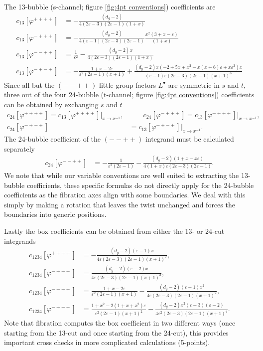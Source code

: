 \documentclass[11pt]{article}
\newcommand{\nn}{\nonumber}
\newcommand{\vphi}{\varphi}
\newcommand{\vep}{\varepsilon}
\begin{document}
The 13-bubble (s-channel; figure \ref{fig:4pt conventions}) coefficients are
\begin{align} \label{4pt first coeff}
	c_{13}[\vphi^{++++}]
	&= -\frac{(d_g-2)}{4(2\vep-3) (2\vep-1) (1+x)}
	\\
	c_{13}[\vphi^{-+++}]
	&= - \frac{ (d_g-2) }{4(\vep-1) (2\vep-3) (2\vep-1) } \frac{x^2 (3+x-\vep) }{(1+x)}
	\\
	c_{13}[\vphi^{--++}]
	&= \frac{1}{\vep^2} - \frac{(d_g-2) x}{4(2\vep-3) (2\vep-1) (1+x)}
	\label{eq: 13 --++}
	\\
	c_{13}[\vphi^{-+-+}]
	&= -\frac{1 + x - 2\vep}{\vep^2 (2 \vep -1) (x+1)}
	+ \frac{(d_g-2) x (-2 +5 x + x^2 - x(x+6)\vep + x\vep^2) x}{(\vep -1) \vep  (2 \vep -3) (2 \vep -1) (x+1)^3}
\end{align}
Since all but the $(--++)$ little group factors $L^\bullet$ are symmetric in $s$ and $t$, three out of the four 24-bubble (t-channel; figure \ref{fig:4pt conventions}) coefficients can be obtained by exchanging $s$ and $t$
\begin{align}
	c_{24}[\vphi^{++++}]
	= c_{13}[\vphi^{++++}]\vert_{x\to x^{-1}},
	&\qquad
	c_{24}[\vphi^{-+++}]
	= c_{13}[\vphi^{-+++}]\vert_{x\to x^{-1}},
	\nn \\
	c_{24}[\vphi^{-+-+}]
	&= c_{13}[\vphi^{-+-+}]\vert_{x\to x^{-1}}.
\end{align}
The 24-bubble coefficient of the $(--++)$ integrand must be calculated separately
\begin{align}
	c_{24}[\vphi^{--++}]
	&= -\frac{1}{\vep^2 (2\vep-1)} - \frac{(d_g-2) (1+x-x\vep)}{4(1+x)\vep(2\vep-3)(2\vep-1)}.
\end{align}
We note that while our variable conventions are well suited to extracting the 13-bubble coefficients, these specific
formulas do not directly apply for the 24-bubble coefficients as the fibration axes align with some boundaries. We deal with this simply by making a rotation that leaves the twist unchanged and forces the boundaries into generic positions.

Lastly the box coefficients can be obtained from either the 13- or 24-cut integrands
\begin{align}
	c_{1234}[\vphi^{++++}]
	&= -\frac{(d_g-2) (\vep -1)  x}{4\vep  (2 \vep -3) (2 \vep -1) (x+1)^2},
	\\
	c_{1234}[\vphi^{-+++}]
	&= \frac{(d_g-2) (\vep -2) x}{4\vep  (2 \vep -3) (2 \vep -1) (x+1)^3},
	\\
	c_{1234}[\vphi^{--++}]
	&= \frac{1+x- 2\vep}{\vep ^2 (2 \vep -1) (x+1)}
		-\frac{(d_g-2) (\vep -1) x^2}{4\vep  (2 \vep -3) (2 \vep -1) (x+1)^2},
	\\
	c_{1234}[\vphi^{-+-+}]
	&= \frac{ 1 + x^2 - 2(1+x+x^2)\vep }{\vep ^2 (2 \vep -1) (x+1)^2} 
		-\frac{(d_g-2) x^2 (\vep -3) (\vep -2)}{4\vep ^2 (2 \vep -3) (2 \vep -1) (x+1)^4}. \label{4pt last coeff}
\end{align}
Note that fibration computes the box coefficient in two different ways (once starting from the 13-cut and once starting from the 24-cut), this provides important cross checks in more complicated calculations (5-points).
\end{document}
